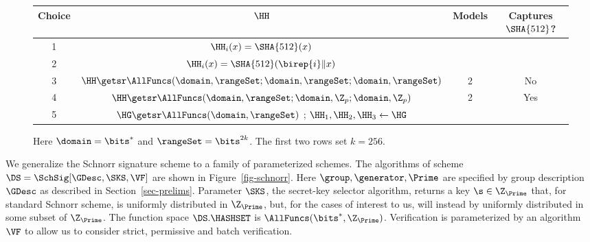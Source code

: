 \begin{figure}[t]
\begin{center}\renewcommand{\arraystretch}{1.3}
	\begin{tabular}{|c||c|c|c|}\hline
	\textbf{Choice} & $\HH$ & Models & Captures $\SHA{512}$? \\ \hline\hline
1 & $\HH_i(x)=\SHA{512}(x)$ & &  \\ \hline
2 & $\HH_i(x)=\SHA{512}(\birep{i}\| x)$ & & \\ \hline\hline
3 & $\HH \getsr \AllFuncs(\domain,\rangeSet;\domain,\rangeSet;\domain,\rangeSet)$ & 2 & No \\
     \hline
4 & $\HH \getsr \AllFuncs(\domain,\rangeSet;\domain,\Z_p;\domain,\Z_p)$ & 2 & Yes \\ \hline
 5 & $\HG\getsr \AllFuncs(\domain,\rangeSet)$ ; $\HH_1,\HH_2,\HH_3 \gets \HG$ & \\ \hline
	\end{tabular}\renewcommand{\arraystretch}{1}
	\end{center}
	\caption{Here $\domain =\bits^*$ and $\rangeSet =\bits^{2k}$. The first two rows set $k=256$. }\label{fig-ge-types}
\end{figure}


 We generalize the Schnorr signature scheme to a family of parameterized schemes. The algorithms of scheme $\DS = \SchSig[\GDesc,\SKS,\VF]$ are shown in Figure~\ref{fig-schnorr}. Here $\group,\generator,\Prime$ are specified by group description $\GDesc$ as described in Section~\ref{sec-prelims}. Parameter $\SKS$, the secret-key selector algorithm, returns a key $\s\in \Z_{\Prime}$ that, for standard Schnorr scheme, is uniformly distributed in $\Z_{\Prime}$, but, for the cases of interest to us, will instead by uniformly distributed in some subset of $\Z_{\Prime}$. The function space $\DS.\HASHSET$ is $\AllFuncs(\bits^*,\Z_{\Prime})$. Verification is parameterized by an algorithm $\VF$ to allow us to consider strict, permissive and batch verification. 



